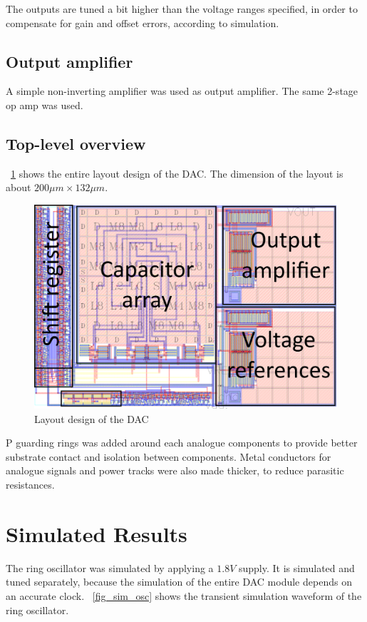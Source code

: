 \documentclass[journal]{IEEEtran}
\newcommand{\fref}[1]{\figurename~\ref{#1}}
\begin{document}
The outputs are tuned a bit higher than the voltage ranges specified, in order to compensate for gain and offset errors, according to simulation.

\subsection{Output amplifier}

A simple non-inverting amplifier was used as output amplifier. The same 2-stage op amp was used.

\subsection{Top-level overview}

\fref{fig_top_lay} shows the entire layout design of the DAC. The dimension of the layout is about $200 \mu m \times 132 \mu m$.

\begin{figure}[!t]
	\centering
	\includegraphics[width=\columnwidth]{top_lay}
	\caption{Layout design of the DAC}
	\label{fig_top_lay}
\end{figure}

P guarding rings was added around each analogue components to provide better substrate contact and isolation between components. Metal conductors for analogue signals and power tracks were also made thicker, to reduce parasitic resistances.

\section{Simulated Results}

The ring oscillator was simulated by applying a $1.8 V$ supply. It is simulated and tuned separately, because the simulation of the entire DAC module depends on an accurate clock. \fref{fig_sim_osc} shows the transient simulation waveform of the ring oscillator.
\end{document}

